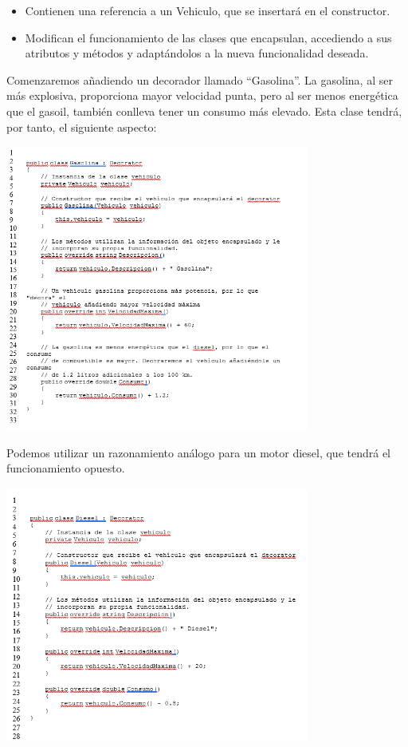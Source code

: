 \begin{flushleft}
\begin{itemize}



  \item Contienen una referencia a un Vehiculo, que se insertará en el constructor.
  \item Modifican el funcionamiento de las clases que encapsulan, accediendo a sus atributos y métodos y adaptándolos a la nueva funcionalidad deseada.


\end{itemize} 

Comenzaremos añadiendo un decorador llamado “Gasolina”. La gasolina, al ser más explosiva, proporciona mayor velocidad punta, pero al ser menos energética que el gasoil, también conlleva tener un consumo más elevado. Esta clase tendrá, por tanto, el siguiente aspecto:

\begin{center}
	\includegraphics[width=10cm]{./Imagenes/decorator8} 
	\end{center}

Podemos utilizar un razonamiento análogo para un motor diesel, que tendrá el funcionamiento opuesto.
\begin{center}
	\includegraphics[width=10cm]{./Imagenes/decorator9} 
	\end{center}



\end{flushleft}
